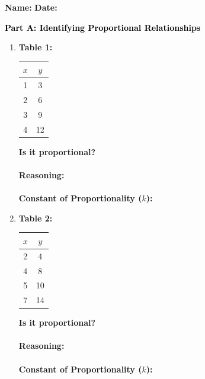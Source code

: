 \documentclass[12pt, letterpaper, fleqn]{article}
\newcommand{\blank}{\underline{\hspace{2.2cm}}}
\newcommand{\blanklong}{\underline{\hspace{6.5cm}}}
\begin{document}
\textbf{Name:} \underline{\hspace{5cm}}
\hfill
\textbf{Date:} \underline{\hspace{3cm}}\\

\begin{tcolorbox}[colback=customteal!20]
\large\textcolor{black}{\textbf{Part A: Identifying Proportional Relationships}}
\end{tcolorbox}

\vspace{3mm}

\begin{enumerate}[itemsep=4.2cm, leftmargin=0.6cm]
\item \textbf{Table 1:}
\begin{center}
\begin{tabular}{|c|c|}
\hline
$x$ & $y$ \\
\hline
1 & 3 \\
2 & 6 \\
3 & 9 \\
4 & 12 \\
\hline
\end{tabular}
\end{center}
\textbf{Is it proportional?} \blank \\ \\
\textbf{Reasoning:} \blanklong \\ \\
\textbf{Constant of Proportionality ($k$):} \blank
\item \textbf{Table 2:}
\begin{center}
\begin{tabular}{|c|c|}
\hline
$x$ & $y$ \\
\hline
2 & 4 \\
4 & 8 \\
5 & 10 \\
7 & 14 \\
\hline
\end{tabular}
\end{center}
\textbf{Is it proportional?} \blank \\ \\
\textbf{Reasoning:} \blanklong \\ \\
\textbf{Constant of Proportionality ($k$):} \blank


\end{enumerate}
\end{document}

